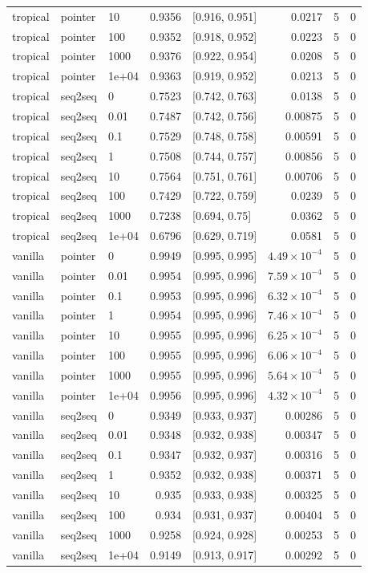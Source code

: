 \documentclass[10pt]{article}
\begin{document}
{\begin{longtable}{lllrlrrr}
tropical & pointer & 10 & 0.9356 & [0.916, 0.951] & 0.0217 & 5 & 0\\
tropical & pointer & 100 & 0.9352 & [0.918, 0.952] & 0.0223 & 5 & 0\\
tropical & pointer & 1000 & 0.9376 & [0.922, 0.954] & 0.0208 & 5 & 0\\
tropical & pointer & 1e+04 & 0.9363 & [0.919, 0.952] & 0.0213 & 5 & 0\\
tropical & seq2seq & 0 & 0.7523 & [0.742, 0.763] & 0.0138 & 5 & 0\\
tropical & seq2seq & 0.01 & 0.7487 & [0.742, 0.756] & 0.00875 & 5 & 0\\
tropical & seq2seq & 0.1 & 0.7529 & [0.748, 0.758] & 0.00591 & 5 & 0\\
tropical & seq2seq & 1 & 0.7508 & [0.744, 0.757] & 0.00856 & 5 & 0\\
tropical & seq2seq & 10 & 0.7564 & [0.751, 0.761] & 0.00706 & 5 & 0\\
tropical & seq2seq & 100 & 0.7429 & [0.722, 0.759] & 0.0239 & 5 & 0\\
tropical & seq2seq & 1000 & 0.7238 & [0.694, 0.75] & 0.0362 & 5 & 0\\
tropical & seq2seq & 1e+04 & 0.6796 & [0.629, 0.719] & 0.0581 & 5 & 0\\
vanilla & pointer & 0 & 0.9949 & [0.995, 0.995] & $4.49\times10^{-4}$ & 5 & 0\\
vanilla & pointer & 0.01 & 0.9954 & [0.995, 0.996] & $7.59\times10^{-4}$ & 5 & 0\\
vanilla & pointer & 0.1 & 0.9953 & [0.995, 0.996] & $6.32\times10^{-4}$ & 5 & 0\\
vanilla & pointer & 1 & 0.9954 & [0.995, 0.996] & $7.46\times10^{-4}$ & 5 & 0\\
vanilla & pointer & 10 & 0.9955 & [0.995, 0.996] & $6.25\times10^{-4}$ & 5 & 0\\
vanilla & pointer & 100 & 0.9955 & [0.995, 0.996] & $6.06\times10^{-4}$ & 5 & 0\\
vanilla & pointer & 1000 & 0.9955 & [0.995, 0.996] & $5.64\times10^{-4}$ & 5 & 0\\
vanilla & pointer & 1e+04 & 0.9956 & [0.995, 0.996] & $4.32\times10^{-4}$ & 5 & 0\\
vanilla & seq2seq & 0 & 0.9349 & [0.933, 0.937] & 0.00286 & 5 & 0\\
vanilla & seq2seq & 0.01 & 0.9348 & [0.932, 0.938] & 0.00347 & 5 & 0\\
vanilla & seq2seq & 0.1 & 0.9347 & [0.932, 0.937] & 0.00316 & 5 & 0\\
vanilla & seq2seq & 1 & 0.9352 & [0.932, 0.938] & 0.00371 & 5 & 0\\
vanilla & seq2seq & 10 & 0.935 & [0.933, 0.938] & 0.00325 & 5 & 0\\
vanilla & seq2seq & 100 & 0.934 & [0.931, 0.937] & 0.00404 & 5 & 0\\
vanilla & seq2seq & 1000 & 0.9258 & [0.924, 0.928] & 0.00253 & 5 & 0\\
vanilla & seq2seq & 1e+04 & 0.9149 & [0.913, 0.917] & 0.00292 & 5 & 0\\
\bottomrule
\end{longtable}
}
\end{document}
